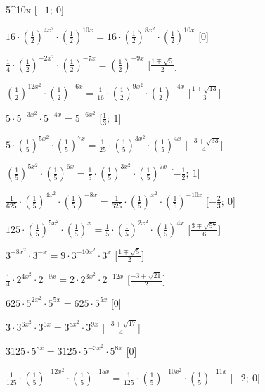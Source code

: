 \begin{esercizio}
\begin{enumeratea}
5^{{10x}}\)
   \hfill [\(-1;~0\)]
  \item  \(16 \cdot \left(\frac{1}{2}\right)^{{4x^2}} \cdot 
\left(\frac{1}{2}\right)^{{10x}} = 16 \cdot \left(\frac{1}{2}\right)^{{8x^2}} 
\cdot \left(\frac{1}{2}\right)^{{10x}}\)
   \hfill [\(0\)]
  \item  \(\frac{1}{4} \cdot \left(\frac{1}{2}\right)^{{-2x^2}} \cdot 
\left(\frac{1}{2}\right)^{{-7x}} = \left(\frac{1}{2}\right)^{{-9x}}\)
   \hfill [\(\frac{1 \mp \sqrt{5}} 2\)]
  \item  \(\left(\frac{1}{2}\right)^{{12x^2}} \cdot 
\left(\frac{1}{2}\right)^{{-6x}} = \frac{1}{16} \cdot 
\left(\frac{1}{2}\right)^{{9x^2}} \cdot \left(\frac{1}{2}\right)^{{-4x}}\)
   \hfill [\(\frac{1 \mp \sqrt{13}} 3\)]
  \item  \(5 \cdot 5^{{-3x^2}} \cdot 5^{{-4x}} = 5^{{-6x^2}}\)
   \hfill [\(\frac{1}{3};~1\)]
  \item  \(5 \cdot \left(\frac{1}{5}\right)^{{5x^2}} \cdot 
\left(\frac{1}{5}\right)^{{7x}} = \frac{1}{25} \cdot 
\left(\frac{1}{5}\right)^{{3x^2}} \cdot \left(\frac{1}{5}\right)^{{4x}}\)
   \hfill [\(\frac{-3 \mp \sqrt{33}} 4\)]
  \item  \(\left(\frac{1}{5}\right)^{{5x^2}} \cdot 
\left(\frac{1}{5}\right)^{{6x}} = \frac{1}{5} \cdot 
\left(\frac{1}{5}\right)^{{3x^2}} \cdot \left(\frac{1}{5}\right)^{{7x}}\)
   \hfill [\(-\frac{1}{2};~1\)]
  \item  \(\frac{1}{625} \cdot \left(\frac{1}{5}\right)^{{4x^2}} \cdot 
\left(\frac{1}{5}\right)^{{-8x}} = \frac{1}{625} \cdot 
\left(\frac{1}{5}\right)^{{x^2}} \cdot \left(\frac{1}{5}\right)^{{-10x}}\)
   \hfill [\(-\frac{2}{3};~0\)]
  \item  \(125 \cdot \left(\frac{1}{5}\right)^{{5x^2}} \cdot 
\left(\frac{1}{5}\right)^{{x}} = \frac{1}{5} \cdot 
\left(\frac{1}{5}\right)^{{2x^2}} \cdot \left(\frac{1}{5}\right)^{{4x}}\)
   \hfill [\(\frac{3 \mp \sqrt{57}} 6\)]
  \item  \(3^{{-8x^2}} \cdot 3^{{-x}} = 9 \cdot 3^{{-10x^2}} \cdot 3^{{x}}\)
   \hfill [\(\frac{1 \mp \sqrt{5}} 2\)]
  \item  \(\frac{1}{4} \cdot 2^{{4x^2}} \cdot 2^{{-9x}} = 2 \cdot 2^{{3x^2}} 
\cdot 2^{{-12x}}\)
   \hfill [\(\frac{-3 \mp \sqrt{21}} 2\)]
  \item  \(625 \cdot 5^{{2x^2}} \cdot 5^{{5x}} = 625 \cdot 5^{{5x}}\)
   \hfill [\(0\)]
  \item  \(3 \cdot 3^{{6x^2}} \cdot 3^{{6x}} = 3^{{8x^2}} \cdot 3^{{9x}}\)
   \hfill [\(\frac{-3 \mp \sqrt{17}} 4\)]
  \item  \(3125 \cdot 5^{{8x}} = 3125 \cdot 5^{{-3x^2}} \cdot 5^{{8x}}\)
   \hfill [\(0\)]
  \item  \(\frac{1}{125} \cdot \left(\frac{1}{5}\right)^{{-12x^2}} \cdot 
\left(\frac{1}{5}\right)^{{-15x}} = \frac{1}{125} \cdot 
\left(\frac{1}{5}\right)^{{-10x^2}} \cdot \left(\frac{1}{5}\right)^{{-11x}}\)
   \hfill [\(-2;~0\)]
 \end{enumeratea}
\end{esercizio}


